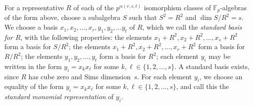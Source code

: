 \documentclass[12pt]{article}
\begin{document}
For a representative $R$ of each of the $p^{\alpha(r,s,t)}$ isomorphism classes of $\mathbb{F}_p$-algebras of the form above, choose a subalgebra $S$ such that $S^2=R^2$ and $\dim S/R^2 = s$. We choose a basis $x_1,x_2,\ldots,x_r,y_1,y_2,\ldots y_t$ of $R$, which we call the \emph{standard basis for $R$}, with the following properties: the elements $x_1+R^2,x_2+R^2,\ldots,x_s+R^2$ form a basis for $S/R^2$; the elements $x_1+R^2,x_2+R^2,\ldots,x_r+R^2$ form a basis for $R/R^2$; the elements $y_1,y_2,\ldots,y_t$ form a basis for $R^2$; each element $y_i$ may be written in the form $y_i=x_kx_\ell$ for some $k,\ell\in\{1,2,\ldots,s\}$. A standard basis exists, since $R$ has cube zero and Sims dimension~$s$. For each element $y_i$, we choose an equality of the form $y_i=x_kx_\ell$ for some $k,\ell\in\{1,2,\ldots,s\}$, and call this the \emph{standard monomial representation} of $y_i$.
\end{document}
